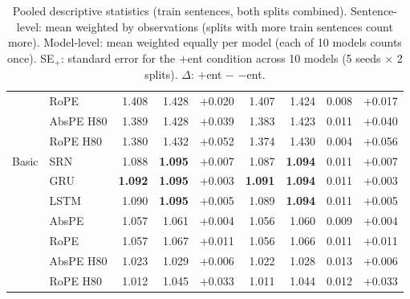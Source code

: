 \begin{table}[t]
\begin{tabular}{@{}llrrrrrrr@{}}
 & RoPE & 1.408 & 1.428 & +0.020 & 1.407 & 1.424 & 0.008 & +0.017 \\
 & AbsPE H80 & 1.389 & 1.428 & +0.039 & 1.383 & 1.423 & 0.011 & +0.040 \\
 & RoPE H80 & 1.380 & 1.432 & +0.052 & 1.374 & 1.430 & 0.004 & +0.056 \\
\addlinespace
Basic & SRN & 1.088 & \textbf{1.095} & +0.007 & 1.087 & \textbf{1.094} & 0.011 & +0.007 \\
 & GRU & \textbf{1.092} & \textbf{1.095} & +0.003 & \textbf{1.091} & \textbf{1.094} & 0.011 & +0.003 \\
 & LSTM & 1.090 & \textbf{1.095} & +0.005 & 1.089 & \textbf{1.094} & 0.011 & +0.005 \\
 & AbsPE & 1.057 & 1.061 & +0.004 & 1.056 & 1.060 & 0.009 & +0.004 \\
 & RoPE & 1.057 & 1.067 & +0.011 & 1.056 & 1.066 & 0.011 & +0.011 \\
 & AbsPE H80 & 1.023 & 1.029 & +0.006 & 1.022 & 1.028 & 0.013 & +0.006 \\
 & RoPE H80 & 1.012 & 1.045 & +0.033 & 1.011 & 1.044 & 0.012 & +0.033 \\
\bottomrule
\end{tabular}
\caption{\small Pooled descriptive statistics (train sentences, both splits combined). Sentence-level: mean weighted by observations (splits with more train sentences count more). Model-level: mean weighted equally per model (each of 10 models counts once). SE$_{+}$: standard error for the $+$ent condition across 10 models (5 seeds $\times$ 2 splits). $\Delta$: $+$ent $-$ $-$ent.}
\label{tab:descriptive_pooled_train}
\end{table}
